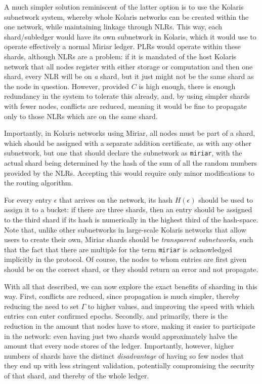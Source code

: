 \documentclass{extreport}
\begin{document}
A much simpler solution reminiscent of the latter option is to use the Kolaris subnetwork system, whereby whole Kolaris networks can be created within the one network, while maintaining linkage through NLRs. This way, each shard/subledger would have its own subnetwork in Kolaris, which it would use to operate effectively a normal Miriar ledger. PLRs would operate within these shards, although NLRs are a problem: if it is mandated of the host Kolaris network that all nodes register with either storage or computation and then one shard, every NLR will be on \emph{a} shard, but it just might not be the same shard as the node in question. However, provided \(C\) is high enough, there is enough redundancy in the system to tolerate this already, and, by using simpler shards with fewer nodes, conflicts are reduced, meaning it would be fine to propagate only to those NLRs which are on the same shard.

Importantly, in Kolaris networks using Miriar, all nodes must be part of a shard, which should be assigned with a separate addition certificate, as with any other subnetwork, but one that should declare the subnetwork as \texttt{miriar}, with the actual shard being determined by the hash of the sum of all the random numbers provided by the NLRs. Accepting this would require only minor modifications to the routing algorithm.

For every entry \(\epsilon\) that arrives on the network, its hash \(H(\epsilon)\) should be used to assign it to a bucket: if there are three shards, then an entry should be assigned to the third shard if its hash is numerically in the highest third of the hash-space. Note that, unlike other subnetworks in large-scale Kolaris networks that allow users to create their own, Miriar shards should be \emph{transparent subnetworks}, such that the fact that there are multiple for the term \texttt{miriar} is acknowledged implicitly in the protocol. Of course, the nodes to whom entries are first given should be on the correct shard, or they should return an error and not propagate.

With all that described, we can now explore the exact benefits of sharding in this way. First, conflicts are reduced, since propagation is much simpler, thereby reducing the need to set \(\Gamma\) to higher values, and improving the speed with which entries can enter confirmed epochs. Secondly, and primarily, there is the reduction in the amount that nodes have to store, making it easier to participate in the network: even having just two shards would approximately halve the amount that every node stores of the ledger. Importantly, however, higher numbers of shards have the distinct \emph{disadvantage} of having so few nodes that they end up with less stringent validation, potentially compromising the security of that shard, and thereby of the whole ledger.
\end{document}
